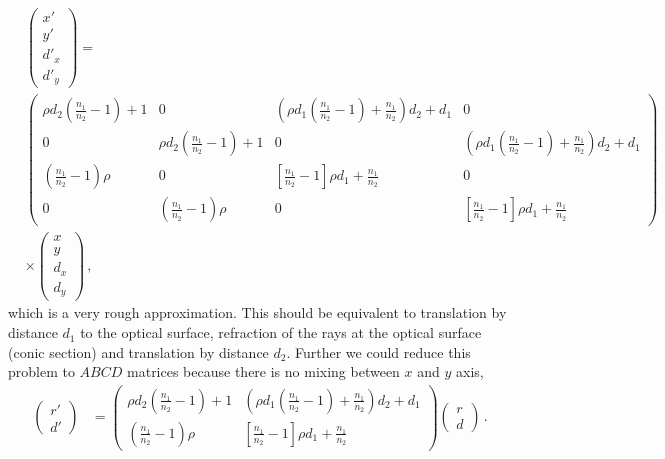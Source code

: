 \documentclass[12pt,a4paper,twoside,openright,BCOR10mm,headsepline,titlepage,abstracton,chapterprefix,final]{scrreprt}
\begin{document}
\begin{align}
 &\begin{pmatrix} x' \\ y' \\ {d'}_x \\ {d'}_y \end{pmatrix} =\nonumber\\ 
 &\begin{pmatrix} \rho d_{2} {\left(\frac{n_{1}}{n_{2}} - 1\right)} + 1 & 0 & {\left(\rho d_{1} \left(\frac{n_{1}}{n_{2}} - 1\right) + \frac{n_{1}}{n_{2}}\right)} d_{2} + d_{1} & 0 \\ 
		  0 & \rho d_{2} {\left(\frac{n_{1}}{n_{2}} - 1\right)} + 1 & 0 & {\left(\rho d_{1} \left(\frac{n_{1}}{n_{2}} - 1\right) + \frac{n_{1}}{n_{2}}\right)} d_{2} + d_{1} \\ 
		  \left(\frac{n_{1}}{n_{2}} - 1\right) \rho & 0 & \left[\frac{n_{1}}{n_{2}} - 1\right]\rho d_1 + \frac{n_{1}}{n_{2}} & 0 \\ 
		  0 & \left(\frac{n_{1}}{n_{2}} - 1\right) \rho & 0 & \left[\frac{n_{1}}{n_{2}} - 1\right]\rho d_1 + \frac{n_{1}}{n_{2}}\end{pmatrix}\nonumber\\ 
 &\times\begin{pmatrix} x \\ y \\ d_x \\ d_y \end{pmatrix}\,,
\end{align}
which is a very rough approximation.
This should be equivalent to translation by distance $d_1$ to the optical surface,
refraction of the rays at the optical surface (conic section) and translation by distance
$d_2$. Further we could reduce this problem to $ABCD$ matrices because there is no mixing
between $x$ and $y$ axis,
\begin{align}
 \begin{pmatrix} r'  \\ d' \end{pmatrix} &= 
 \begin{pmatrix} \rho d_{2} {\left(\frac{n_{1}}{n_{2}} - 1\right)} + 1 & {\left(\rho d_{1} \left(\frac{n_{1}}{n_{2}} - 1\right) + \frac{n_{1}}{n_{2}}\right)} d_{2} + d_{1} \\ 
		\left(\frac{n_{1}}{n_{2}} - 1\right) \rho &  \left[\frac{n_{1}}{n_{2}} - 1\right]\rho d_1 + \frac{n_{1}}{n_{2}} \end{pmatrix}
 \begin{pmatrix} r  \\ d \end{pmatrix}\,.
\end{align}
\end{document}
